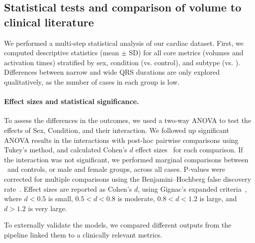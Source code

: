 \subsection{Statistical tests and comparison of volume to clinical literature}
We performed a multi‐step statistical analysis of our cardiac dataset.
First, we computed descriptive statistics (mean $\pm$ SD) for all core metrics (volumes and activation times)
stratified by sex, condition (\HF vs. control), and subtype (\HFN vs. \HFW). 
Differences between narrow and wide QRS durations are only explored qualitatively, as the number 
of cases in each group is low. 

\paragraph{Effect sizes and statistical significance.}
To assess the differences in the outcomes, we used a two-way ANOVA to test the effects of 
Sex, Condition, and their interaction.
We followed up significant ANOVA results in the interactions with post-hoc pairwise comparisons 
using Tukey's method, 
and calculated Cohen's $d$ effect sizes~\cite{cohen-2013-statistical} for each comparison.
If the interaction was not significant, we performed marginal comparisons
between \HF\ and controls, or male and female groups, across all cases.
P‐values were corrected for multiple comparisons using the Benjamini–Hochberg 
false discovery rate~\cite{Benjamini1995ControllingTF}. 
Effect sizes are reported as Cohen's $d$, 
using Gignac's expanded criteria~\cite{gignac-2016-effects},
where $d<0.5$ is small, 
      $0.5<d<0.8$ is moderate, 
      $0.8<d<1.2$ is large, 
  and $d>1.2$ is very large.

To externally validate the models, 
we compared different outputs from the pipeline %
linked them to a clinically relevant metrics.

